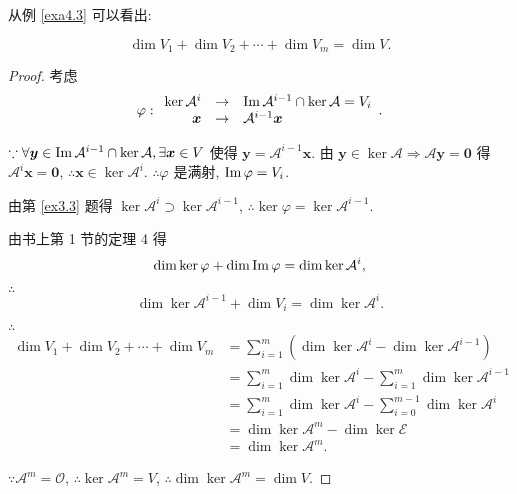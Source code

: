 \documentclass[color=black,device=normal,lang=cn,mode=geye]{elegantnote}
\begin{document}
从例 \ref{exa4.3} 可以看出:
\begin{lemma}\label{l4.1}
    \[\dim V_1+\dim V_2+\cdots+\dim V_m=\dim V.\]
\end{lemma}
\begin{proof}
    考虑
    \[\varphi:\begin{array}{rcl}
        \ker\mathcal{A}^i & \to & \operatorname{Im} \mathcal{A}^{i-1}\cap\ker\mathcal{A}=V_i \\
        \boldsymbol{x} & \to & \mathcal{A}^{i-1}\boldsymbol{x} \\
    \end{array}.\]

    $\because\forall\boldsymbol{y}\in\operatorname{Im} \mathcal{A}^{i-1}\cap\ker\mathcal{A},\exists\boldsymbol{x}\in V$ 使得 $\boldsymbol{y}=\mathcal{A}^{i-1}\boldsymbol{x}$. 由 $\boldsymbol{y}\in\ker\mathcal{A}\Rightarrow\mathcal{A}\boldsymbol{y}=\boldsymbol{0}$ 得 $\mathcal{A}^i\boldsymbol{x}=\boldsymbol{0}$, $\therefore\boldsymbol{x}\in\ker\mathcal{A}^i$. $\therefore\varphi$ 是满射, $\operatorname{Im} \varphi=V_i$.

    由第 \ref{ex3.3} 题得 $\ker\mathcal{A}^i\supset\ker\mathcal{A}^{i-1}$, $\therefore\ker\varphi=\ker\mathcal{A}^{i-1}$.

    由书上第 1 节的定理 4 得
    \[\dim\ker\varphi+\dim\operatorname{Im} \varphi=\dim\ker\mathcal{A}^i,\]

    $\therefore$
    \begin{equation}\label{eq4.6}
        \dim\ker\mathcal{A}^{i-1}+\dim V_i=\dim\ker\mathcal{A}^i.
    \end{equation}

    $\therefore$
    \begin{align*}
        \dim V_1+\dim V_2+\cdots+\dim V_m & =\sum\limits_{i=1}^m\left(\dim\ker\mathcal{A}^i-\dim\ker\mathcal{A}^{i-1}\right) \\
        & =\sum\limits_{i=1}^m\dim\ker\mathcal{A}^i-\sum\limits_{i=1}^m\dim\ker\mathcal{A}^{i-1} \\
        & =\sum\limits_{i=1}^m\dim\ker\mathcal{A}^i-\sum\limits_{i=0}^{m-1}\dim\ker\mathcal{A}^i \\
        & =\dim\ker\mathcal{A}^m-\dim\ker\mathcal{E} \\
        & =\dim\ker\mathcal{A}^m.
    \end{align*}

    $\because\mathcal{A}^m=\mathcal{O}$, $\therefore\ker\mathcal{A}^m=V$, $\therefore\dim\ker\mathcal{A}^m=\dim V$.
\end{proof}
\end{document}
